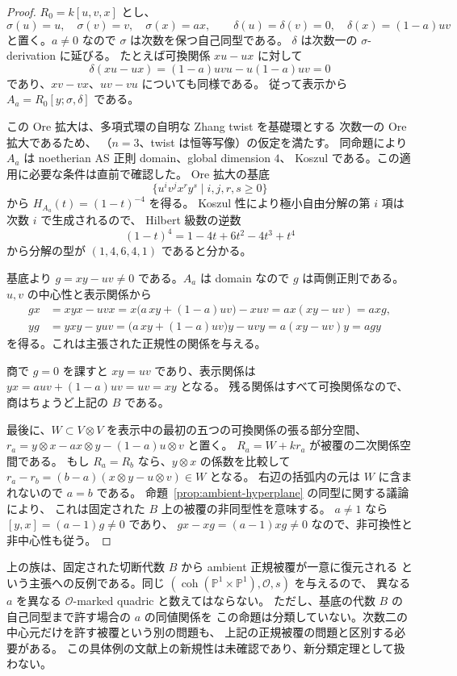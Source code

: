 \begin{proof}
$R_0=k[u,v,x]$ とし、
\[
 \sigma(u)=u,\quad\sigma(v)=v,\quad\sigma(x)=ax,
 \qquad
 \delta(u)=\delta(v)=0,\quad\delta(x)=(1-a)uv
\]
と置く。$a\ne0$ なので $\sigma$ は次数を保つ自己同型である。
$\delta$ は次数一の $\sigma$-derivation に延びる。
たとえば可換関係 $xu-ux$ に対して
\[
 \delta(xu-ux)=(1-a)uvu-u(1-a)uv=0
\]
であり、$xv-vx$、$uv-vu$ についても同様である。
従って表示から
$A_a=R_0[y;\sigma,\delta]$ である。

この Ore 拡大は、多項式環の自明な Zhang twist を基礎環とする
次数一の Ore 拡大であるため、
\cite[Proposition~2.2]{LV2026}（$n=3$、twist は恒等写像）の仮定を満たす。
同命題により $A_a$ は noetherian AS 正則 domain、global dimension $4$、
Koszul である。この適用に必要な条件は直前で確認した。
Ore 拡大の基底
\[
 \{u^i v^j x^r y^s\mid i,j,r,s\geq0\}
\]
から $H_{A_a}(t)=(1-t)^{-4}$ を得る。
Koszul 性により極小自由分解の第 $i$ 項は次数 $i$ で生成されるので、
Hilbert 級数の逆数
\[
 (1-t)^4=1-4t+6t^2-4t^3+t^4
\]
から分解の型が $(1,4,6,4,1)$ であると分かる。

基底より $g=xy-uv\ne0$ である。$A_a$ は domain なので $g$ は両側正則である。
$u,v$ の中心性と表示関係から
\[
 \begin{split}
 gx&=xyx-uvx
     =x\bigl(a\,xy+(1-a)uv\bigr)-xuv
     =a x(xy-uv)=a xg,\\
 yg&=yxy-yuv
     =\bigl(a\,xy+(1-a)uv\bigr)y-uvy
     =a(xy-uv)y=a gy
 \end{split}
\]
を得る。これは主張された正規性の関係を与える。

商で $g=0$ を課すと $xy=uv$ であり、表示関係は
$yx=a uv+(1-a)uv=uv=xy$ となる。
残る関係はすべて可換関係なので、商はちょうど上記の $B$ である。

最後に、$W\subset V\otimes V$ を表示中の最初の五つの可換関係の張る部分空間、
$r_a=y\otimes x-a x\otimes y-(1-a)u\otimes v$ と置く。
$R_a=W+kr_a$ が被覆の二次関係空間である。
もし $R_a=R_b$ なら、$y\otimes x$ の係数を比較して
$r_a-r_b=(b-a)(x\otimes y-u\otimes v)\in W$ となる。
右辺の括弧内の元は $W$ に含まれないので $a=b$ である。
命題~\ref{prop:ambient-hyperplane} の同型に関する議論により、
これは固定された $B$ 上の被覆の非同型性を意味する。
$a\ne1$ なら $[y,x]=(a-1)g\ne0$ であり、
$gx-xg=(a-1)xg\ne0$ なので、非可換性と非中心性も従う。
\end{proof}

\begin{remark}[この命題が分類について述べる範囲]
上の族は、固定された切断代数 $B$ から ambient 正規被覆が一意に復元される
という主張への反例である。同じ
$(\operatorname{coh}(\mathbb P^1\times\mathbb P^1),\mathcal O,s)$ を与えるので、
異なる $a$ を異なる $\mathcal O$-marked quadric と数えてはならない。
ただし、基底の代数 $B$ の自己同型まで許す場合の $a$ の同値関係を
この命題は分類していない。次数二の中心元だけを許す被覆という別の問題も、
上記の正規被覆の問題と区別する必要がある。
この具体例の文献上の新規性は未確認であり、新分類定理として扱わない。
\end{remark}

